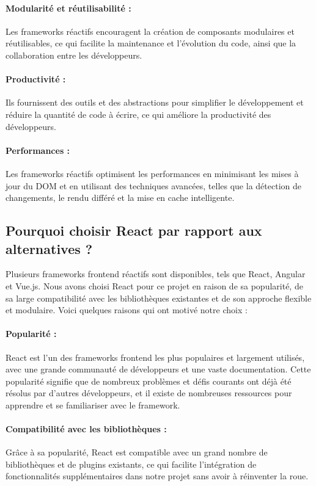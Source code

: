 \paragraph{Modularité et réutilisabilité :} Les frameworks réactifs encouragent la création de composants modulaires et réutilisables, ce qui facilite la maintenance et l'évolution du code, ainsi que la collaboration entre les développeurs.
\paragraph{Productivité :} Ils fournissent des outils et des abstractions pour simplifier le développement et réduire la quantité de code à écrire, ce qui améliore la productivité des développeurs.
\paragraph{Performances :} Les frameworks réactifs optimisent les performances en minimisant les mises à jour du DOM et en utilisant des techniques avancées, telles que la détection de changements, le rendu différé et la mise en cache intelligente.

\subsection{Pourquoi choisir React par rapport aux alternatives ?}

Plusieurs frameworks frontend réactifs sont disponibles, tels que React, Angular et Vue.js. Nous avons choisi React\cite{QuickStartReact} pour ce projet en raison de sa popularité, de sa large compatibilité avec les bibliothèques existantes et de son approche flexible et modulaire. Voici quelques raisons qui ont motivé notre choix :

\paragraph{Popularité :} React est l'un des frameworks frontend les plus populaires et largement utilisés, avec une grande communauté de développeurs et une vaste documentation. Cette popularité signifie que de nombreux problèmes et défis courants ont déjà été résolus par d'autres développeurs, et il existe de nombreuses ressources pour apprendre et se familiariser avec le framework.
\paragraph{Compatibilité avec les bibliothèques :} Grâce à sa popularité, React est compatible avec un grand nombre de bibliothèques et de plugins existants, ce qui facilite l'intégration de fonctionnalités supplémentaires dans notre projet sans avoir à réinventer la roue.
